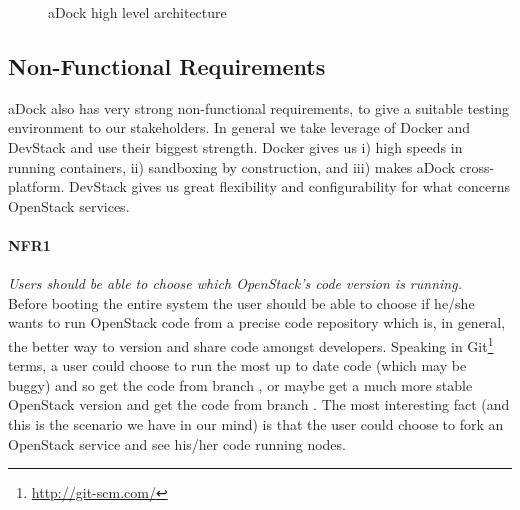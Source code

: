\begin{figure}[H]
\label{fig:adock_high_arch}
\caption{aDock high level architecture}
\end{figure}

\subsection{Non-Functional Requirements}
\label{sub:nonfunc_req}
aDock also has very strong non-functional requirements, to give a suitable testing environment to our stakeholders. In general we take leverage of Docker and DevStack and use their biggest strength. Docker gives us i) high speeds in running containers, ii) sandboxing by construction, and iii) makes aDock cross-platform. DevStack gives us great flexibility and configurability for what concerns OpenStack services.

\paragraph{NFR1}\label{p:nfr1} \emph{Users should be able to choose which OpenStack's code version is running.} \hfill \\
Before booting the entire system the user should be able to choose if he/she wants to run OpenStack code from a precise code repository which is, in general, the better way to version and share code amongst developers. Speaking in Git\footnote{\url{http://git-scm.com/}} terms, a user could choose to run the most up to date code (which may be buggy) and so get the code from branch , or maybe get a much more stable OpenStack version and get the code from branch . The most interesting fact (and this is the scenario we have in our mind) is that the user could choose to fork an OpenStack service and see his/her code running nodes.

